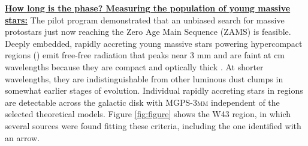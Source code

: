 \documentclass[11pt,preprint]{aastex_nofoot}
\newcommand{\MUSTANG}{\textsc{MUSTANG-2}\xspace}
\newcommand{\MGPS}{\textsc{MGPS-3mm}\xspace}
\begin{document}
% 
% 




\underline{\textbf{\helv How long is the \hchii phase?  Measuring the population of young massive stars:}}
The pilot program demonstrated that an unbiased search for massive protostars
just now reaching the Zero Age Main Sequence (ZAMS) is feasible.  Deeply
embedded, rapidly accreting young massive stars powering hypercompact \hii
regions (\hchii) emit free-free radiation that peaks near 3 mm and are faint at
cm wavelengths because they are compact and optically thick \citep[e.g.,
G20.08N][]{Galvan-Madrid2009a}.  At shorter wavelengths, they are
indistinguishable from other luminous dust clumps in somewhat earlier stages of
evolution.  Individual rapidly accreting stars in \hchii regions are
detectable across the galactic disk with \MGPS independent of the selected
theoretical models.  Figure \ref{fig:figure} shows the W43 region, in which
several sources were found fitting these criteria, including the one identified
with an arrow.
\end{document}
